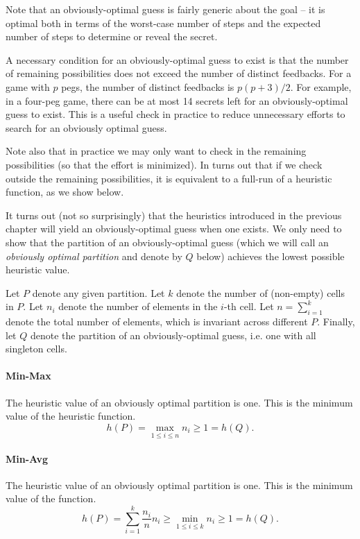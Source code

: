 Note that an obviously-optimal guess is fairly generic about the goal -- it is optimal both in terms of the worst-case number of steps and the expected number of steps to determine or reveal the secret.

A necessary condition for an obviously-optimal guess to exist is that the number of remaining possibilities does not exceed the number of distinct feedbacks. For a game with $p$ pegs, the number of distinct feedbacks is $p(p+3)/2$. For example, in a four-peg game, there can be at most 14 secrets left for an obviously-optimal guess to exist. This is a useful check in practice to reduce unnecessary efforts to search for an obviously optimal guess.

Note also that in practice we may only want to check in the remaining possibilities (so that the effort is minimized). In turns out that if we check outside the remaining possibilities, it is equivalent to a full-run of a heuristic function, as we show below.

It turns out (not so surprisingly) that the heuristics introduced in the previous chapter will yield an obviously-optimal guess when one exists. We only need to show that the partition of an obviously-optimal guess (which we will call an \emph{obviously optimal partition} and denote by $Q$ below) achieves the lowest possible heuristic value.

Let $P$ denote any given partition. Let $k$ denote the number of (non-empty) cells in $P$. Let $n_i$ denote the number of elements in the $i$-th cell. Let $n = \sum_{i=1}^k$ denote the total number of elements, which is invariant across different $P$. Finally, let $Q$ denote the partition of an obviously-optimal guess, i.e. one with all singleton cells.

\paragraph{Min-Max} 
The \minmax{} heuristic value of an obviously optimal partition is one. This is the minimum value of the heuristic function.
\[
h(P) = \max_{1 \le i \le n} n_i \ge 1 = h(Q).
\]

\paragraph{Min-Avg}
The \minavg{} heuristic value of an obviously optimal partition is one. This is the minimum value of the function.
\[
h(P) = \sum_{i=1}^k \frac{n_i}{n} n_i \ge \min_{1 \le i \le k} n_i \ge 1 = h(Q).
\]

